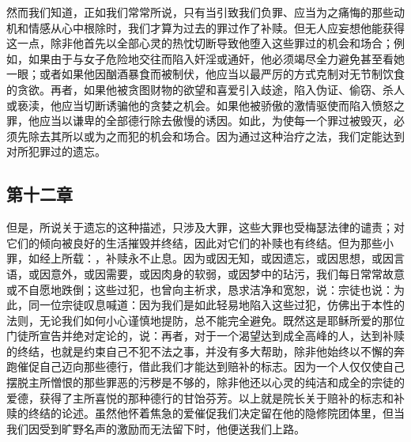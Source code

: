 \par

然而我们知道，正如我们常常所说，只有当引致我们负罪、应当为之痛悔的那些动机和情感从心中根除时，我们才算为过去的罪过作了补赎。但无人应妄想他能获得这一点，除非他首先以全部心灵的热忱切断导致他堕入这些罪过的机会和场合；例如，如果由于与女子危险地交往而陷入奸淫或通奸，他必须竭尽全力避免甚至看她一眼；或者如果他因酗酒暴食而被制伏，他应当以最严厉的方式克制对无节制饮食的贪欲。再者，如果他被贪图财物的欲望和喜爱引入歧途，陷入伪证、偷窃、杀人或亵渎，他应当切断诱骗他的贪婪之机会。如果他被骄傲的激情驱使而陷入愤怒之罪，他应当以谦卑的全部德行除去傲慢的诱因。如此，为使每一个罪过被毁灭，必须先除去其所以或为之而犯的机会和场合。因为通过这种治疗之法，我们定能达到对所犯罪过的遗忘。\par


\subsection{第十二章}

\par

但是，所说关于遗忘的这种描述，只涉及大罪，这些大罪也受梅瑟法律的谴责；对它们的倾向被良好的生活摧毁并终结，因此对它们的补赎也有终结。但为那些小罪，如经上所载：，补赎永不止息。因为或因无知，或因遗忘，或因思想，或因言语，或因意外，或因需要，或因肉身的软弱，或因梦中的玷污，我们每日常常故意或不自愿地跌倒；这些过犯，也曾向主祈求，恳求洁净和宽恕，说：宗徒也说：为此，同一位宗徒叹息喊道：因为我们是如此轻易地陷入这些过犯，仿佛出于本性的法则，无论我们如何小心谨慎地提防，总不能完全避免。既然这是耶稣所爱的那位门徒所宣告并绝对定论的，说：再者，对于一个渴望达到成全高峰的人，达到补赎的终结，也就是约束自己不犯不法之事，并没有多大帮助，除非他始终以不懈的奔跑催促自己迈向那些德行，借此我们才能达到赔补的标志。因为一个人仅仅使自己摆脱主所憎恨的那些罪恶的污秽是不够的，除非他还以心灵的纯洁和成全的宗徒的爱德，获得了主所喜悦的那种德行的甘饴芬芳。以上就是院长关于赔补的标志和补赎的终结的论述。虽然他怀着焦急的爱催促我们决定留在他的隐修院团体里，但当我们因受到旷野名声的激励而无法留下时，他便送我们上路。\par

